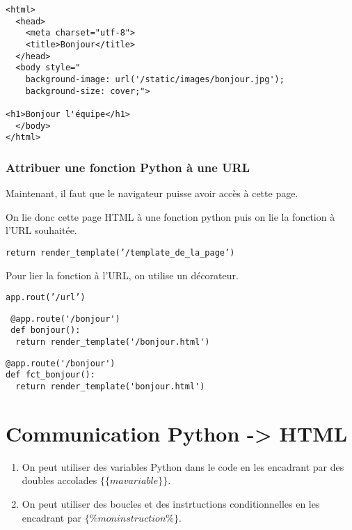 \documentclass[12pt,a4paper]{article}
\begin{document}



\begin{verbatim}
<html>
  <head>
    <meta charset="utf-8">
    <title>Bonjour</title> 
  </head>
  <body style="
    background-image: url('/static/images/bonjour.jpg');
    background-size: cover;">
    
<h1>Bonjour l'équipe</h1>
  </body>
</html>
\end{verbatim}




\subsubsection{Attribuer une fonction Python à une URL}







Maintenant, il faut que le navigateur puisse avoir accès à cette page. 

\par 
\medskip
On lie donc cette page HTML à une fonction python puis on lie la fonction à l'URL souhaitée. \par 
\texttt{return render\_template('/template\_de\_la\_page')}

\par 
\medskip


Pour lier la fonction à l'URL, on utilise un décorateur. \par 
\texttt{app.rout('/url')}

\begin{verbatim}
 @app.route('/bonjour')
 def bonjour():
  return render_template('/bonjour.html')
\end{verbatim}

\begin{verbatim}
@app.route('/bonjour')
def fct_bonjour():
  return render_template('bonjour.html') 

\end{verbatim}


\section{Communication Python ->  HTML}
\begin{enumerate}
  \item On peut utiliser des variables Python dans le code en les encadrant par des doubles accolades $\{\{  ma variable  \}\}$.



  \item On peut utiliser des boucles et des instrtuctions conditionnelles en les encadrant par $\lbrace\%  mon instruction  \%\rbrace$.
\end{enumerate}
\end{document}
